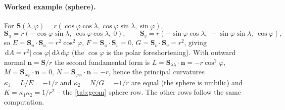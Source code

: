 \documentclass[11pt,a4paper]{article}
\numberwithin{equation}{section}
\newcommand{\abs}[1]{\left\lvert #1 \right\rvert}
\newcommand{\vv}[1]{\mathbf{#1}}
\newcommand{\dd}{\,\mathrm{d}}
\newcommand{\Su}{\vv{S}_u}
\newcommand{\Sv}{\vv{S}_v}
\begin{document}
\paragraph{Worked example (sphere).}
For $\vv{S}(\lambda,\varphi)=r(\cos\varphi\cos\lambda,\cos\varphi\sin\lambda,
\sin\varphi)$,
\[
\Su=r(-\cos\varphi\sin\lambda,\ \cos\varphi\cos\lambda,\ 0),\qquad
\Sv=r(-\sin\varphi\cos\lambda,\ -\sin\varphi\sin\lambda,\ \cos\varphi),
\]
so $E=\Su\!\cdot\!\Su=r^2\cos^2\varphi$, $F=\Su\!\cdot\!\Sv=0$, $G=\Sv\!\cdot\!
\Sv=r^2$, giving $\dd A=r^2\abs{\cos\varphi}\dd\lambda\dd\varphi$ (the
$\cos\varphi$ is the polar foreshortening). With outward normal $\vv{n}=\vv{S}/r$
the second fundamental form is $L=\vv{S}_{\lambda\lambda}\!\cdot\!\vv{n}=
-r\cos^2\varphi$, $M=\vv{S}_{\lambda\varphi}\!\cdot\!\vv{n}=0$,
$N=\vv{S}_{\varphi\varphi}\!\cdot\!\vv{n}=-r$, hence the principal curvatures
$\kappa_1=L/E=-1/r$ and $\kappa_2=N/G=-1/r$ are equal (the sphere is umbilic) and
$K=\kappa_1\kappa_2=1/r^2$ -- the \cref{tab:geom} sphere row. The other rows
follow the same computation.
\end{document}
